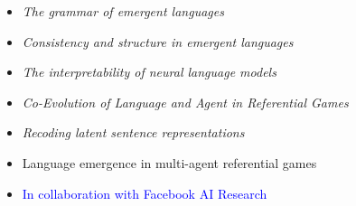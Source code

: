 {{{
{\begin{itemize}
  \item[] \textit{The grammar of emergent languages}
\end{itemize}
}}

{
{\begin{itemize}
  \item[] \textit{Consistency and structure in emergent languages}
\end{itemize}
}}


{
{\begin{itemize}
  \item[] \textit{The interpretability of neural language models}
\end{itemize}
}}

{
{\begin{itemize}
  \item[] \textit{Co-Evolution of Language and Agent in Referential Games}
\end{itemize}
}

{
{\begin{itemize}
  \item[] \textit{Recoding latent sentence representations}
\end{itemize}
}

{
{\begin{itemize}
  \item[] Language emergence in multi-agent referential games
  \item[] \textcolor{blue}{\normalfont In collaboration with Facebook AI Research\vspace{1mm}}
\end{itemize}
}

}}}}}
